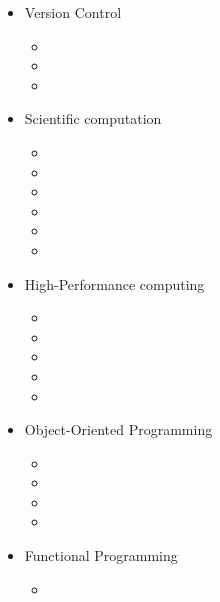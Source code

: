 \documentclass{CurriculumVitae}[10pt, draft, condensed]
\begin{document}
\begin{multicols}{4}
  \begin{itemize}[topsep=0pt]
    \setlength{\itemsep}{-0.3em}
  \item {\footnotesize Version Control}
    \begin{itemize}[topsep=0pt, partopsep=0pt]
      \setlength{\itemsep}{-0.3em}
    \item {}
    \item {}
    \item {}
    \end{itemize}
  \item {\footnotesize Scientific computation}
    \begin{itemize}[topsep=0pt, partopsep=0pt]
      \setlength{\itemsep}{-0.3em}
    \item {}
    \item {}
    \item {}
    \item {}
    \item {}
    \item {}
    \end{itemize}
  \item {\footnotesize High-Performance computing}
    \begin{itemize}[topsep=0pt, partopsep=0pt]
      \setlength{\itemsep}{-0.3em}
    \item {}
    \item {}
    \item {}
    \item {}
    \item {}
    \end{itemize}
  \item {\footnotesize Object-Oriented Programming}
    \begin{itemize}[topsep=0pt, partopsep=0pt]
      \setlength{\itemsep}{-0.3em}
    \item {}
    \item {}
    \item {}
    \item {}
    \end{itemize}
  \item {\footnotesize Functional Programming}
    \begin{itemize}[topsep=0pt, partopsep=0pt]
      \setlength{\itemsep}{-0.3em}
    \item {}

\end{itemize}
\end{itemize}
\end{multicols}
\end{document}
